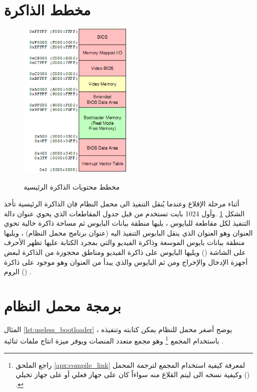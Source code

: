 \documentclass[document.tex]{subfiles}
\begin{document}
\section{مخطط الذاكرة}
\begin{figure}[h!]
  \caption{مخطط محتويات الذاكرة الرئيسية}
  \centering
   \includegraphics[width=0.5\textwidth]{../img/mmap16}
\label{fig:mmap16} 
\end{figure}

أثناء مرحلة الإقلاع وعندما يُنقل التنفيذ الى محمل النظام فان الذاكرة الرئيسية تأخذ الشكل \ref{fig:mmap16} .وأول 1024 بايت تستخدم من قبل جدول المقاطعات الذي يحوي عنوان دالة التنفيذ لكل مقاطعة للبايوس ، يليها منطقة بيانات البايوس ثم مساحة ذاكرة خالية تحوي العنوان  وهو العنوان الذي ينقل البابوس التنفيذ اليه (عنوان برنامج محمل النظام) ، ويليها منطقة بيانات بايوس الموسعة وذاكرة الفيديو والتي بمجرد الكتابة عليها تظهر الأحرف على الشاشة () ويليها البايوس على ذاكرة الفيديو ومناطق محجوزة من الذاكرة لبعض أجهزة الإدخال والإخراج ومن ثم البايوس والذي يبدأ من العنوان  وهو موجود على ذاكرة الروم () .




\section{برمجة محمل النظام}
المثال \ref{lst:useless_bootloader} يوضح أصغر محمل للنظام يمكن كتابته وتنفيذه ، باستخدام المجمع \footnote{راجع الملحق \ref{apx:compile_link} لمعرفة كيفية استخدام المجمع لترجمة المحمل وكيفية نسخه الى  ليتم القلاع منه سواءاً كان على جهاز فعلي أو على جهاز تخيلي () .} وهو مجمع متعدد المنصات ويوفر ميزة انتاج ملفات ثنائية  .\\
\end{document}
